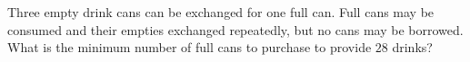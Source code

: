 Three empty drink cans can be exchanged for one full can. Full cans may be consumed and their empties exchanged repeatedly, but no cans may be borrowed. What is the minimum number of full cans to purchase to provide $28$ drinks?
